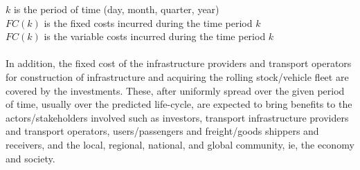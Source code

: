\hspace*{10mm}$k$ is the period of time (day, month, quarter, year)\\
\hspace*{10mm}$FC(k)$ is the fixed costs incurred during the time period $k$\\
\hspace*{10mm}$FC(k)$ is the variable costs incurred during the time period $k$\\\\
In addition, the fixed cost of the infrastructure providers and transport operators for construction of infrastructure and acquiring the rolling stock/vehicle fleet are covered by the investments. These, after uniformly spread over the given period of time, usually over the predicted life-cycle, are expected to bring benefits to the actors/stakeholders involved such as investors, transport infrastructure providers and transport operators, users/passengers and freight/goods shippers and receivers, and the local, regional, national, and global community, ie, the economy and society.
%
